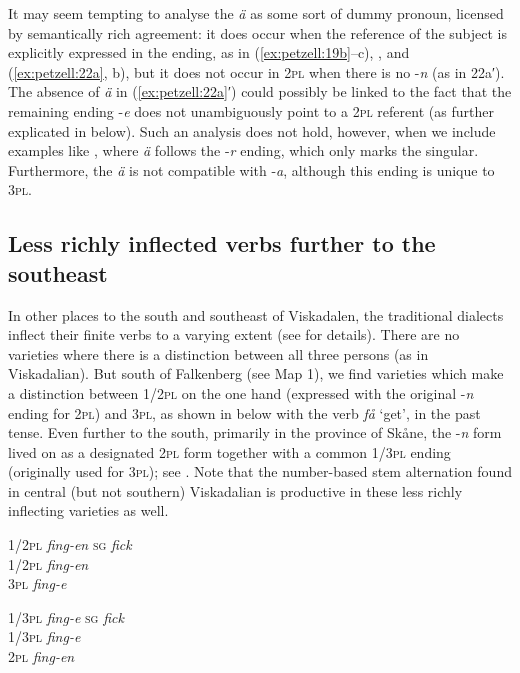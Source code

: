 \documentclass[output=paper,colorlinks,citecolor=brown,draft,draftmode]{langscibook}
\begin{document}
It may seem tempting to analyse the \textit{ä} as some sort of dummy pronoun, licensed by semantically rich agreement: it does occur when the reference of the subject is explicitly expressed in the ending, as in (\ref{ex:petzell:19b}–c), , and (\ref{ex:petzell:22a}, b), but it does not occur in 2\textsc{pl} when there is no -\textit{n} (as in 22a′). The absence of \textit{ä} in (\ref{ex:petzell:22a}′) could possibly be linked to the fact that the remaining ending -\textit{e} does not unambiguously point to a 2\textsc{pl} referent (as further explicated in  below). Such an analysis does not hold, however, when we include examples like , where \textit{ä} follows the -\textit{r} ending, which only marks the singular. Furthermore, the \textit{ä} is not compatible with -\textit{a}, although this ending is unique to 3\textsc{pl}.


\subsection{Less richly inflected verbs further to the southeast}\label{sec:petzell:3.2}


In other places to the south and southeast of Viskadalen, the traditional dialects inflect their finite verbs to a varying extent (see \citealt{Horn2015,Horn2017} for details). There are no varieties where there is a distinction between all three persons (as in Viskadalian). But south of Falkenberg (see Map 1), we find varieties which make a distinction between 1/2\textsc{pl} on the one hand (expressed with the original -\textit{n} ending for 2\textsc{pl}) and 3\textsc{pl}, as shown in  below with the verb \textit{få} ‘get’, in the past tense. Even further to the south, primarily in the province of Skåne, the -\textit{n} form lived on as a designated 2\textsc{pl} form together with a common 1/3\textsc{pl} ending (originally used for 3\textsc{pl}); see . Note that the number-based stem alternation found in central (but not southern) Viskadalian is productive in these less richly inflecting varieties as well.

\ea\label{ex:petzell:23}
\begin{multicols}{2}
\ea \label{ex:petzell:23a}\begin{tabbing}
    1/2\textsc{pl}  \=   \textit{fing-en}  \kill
    \textsc{sg}     \> \textit{fick}\\                          
    1/2\textsc{pl}  \>  \textit{fing-en}\\
    3\textsc{pl}    \>    \textit{fing-e}
    \end{tabbing}
\ex \label{ex:petzell:23b}\begin{tabbing}
   1/3\textsc{pl} \= \textit{fing-e}\kill
   \textsc{sg}    \> \textit{fick}\\
   1/3\textsc{pl} \> \textit{fing-e}\\
   2\textsc{pl}   \> \textit{fing-en}
   \end{tabbing}
\z
\end{multicols}
\z
\end{document}
